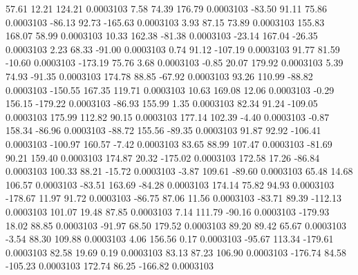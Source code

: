        57.61       12.21      124.21     0.0003103
        7.58       74.39      176.79     0.0003103
      -83.50       91.11       75.86     0.0003103
      -86.13       92.73     -165.63     0.0003103
        3.93       87.15       73.89     0.0003103
      155.83      168.07       58.99     0.0003103
       10.33      162.38      -81.38     0.0003103
      -23.14      167.04      -26.35     0.0003103
        2.23       68.33      -91.00     0.0003103
        0.74       91.12     -107.19     0.0003103
       91.77       81.59      -10.60     0.0003103
     -173.19       75.76        3.68     0.0003103
       -0.85       20.07      179.92     0.0003103
        5.39       74.93      -91.35     0.0003103
      174.78       88.85      -67.92     0.0003103
       93.26      110.99      -88.82     0.0003103
     -150.55      167.35      119.71     0.0003103
       10.63      169.08       12.06     0.0003103
       -0.29      156.15     -179.22     0.0003103
      -86.93      155.99        1.35     0.0003103
       82.34       91.24     -109.05     0.0003103
      175.99      112.82       90.15     0.0003103
      177.14      102.39       -4.40     0.0003103
       -0.87      158.34      -86.96     0.0003103
      -88.72      155.56      -89.35     0.0003103
       91.87       92.92     -106.41     0.0003103
     -100.97      160.57       -7.42     0.0003103
       83.65       88.99      107.47     0.0003103
      -81.69       90.21      159.40     0.0003103
      174.87       20.32     -175.02     0.0003103
      172.58       17.26      -86.84     0.0003103
      100.33       88.21      -15.72     0.0003103
       -3.87      109.61      -89.60     0.0003103
       65.48       14.68      106.57     0.0003103
      -83.51      163.69      -84.28     0.0003103
      174.14       75.82       94.93     0.0003103
     -178.67       11.97       91.72     0.0003103
      -86.75       87.06       11.56     0.0003103
      -83.71       89.39     -112.13     0.0003103
      101.07       19.48       87.85     0.0003103
        7.14      111.79      -90.16     0.0003103
     -179.93       18.02       88.85     0.0003103
      -91.97       68.50      179.52     0.0003103
       89.20       89.42       65.67     0.0003103
       -3.54       88.30      109.88     0.0003103
        4.06      156.56        0.17     0.0003103
      -95.67      113.34     -179.61     0.0003103
       82.58       19.69        0.19     0.0003103
       83.13       87.23      106.90     0.0003103
     -176.74       84.58     -105.23     0.0003103
      172.74       86.25     -166.82     0.0003103
